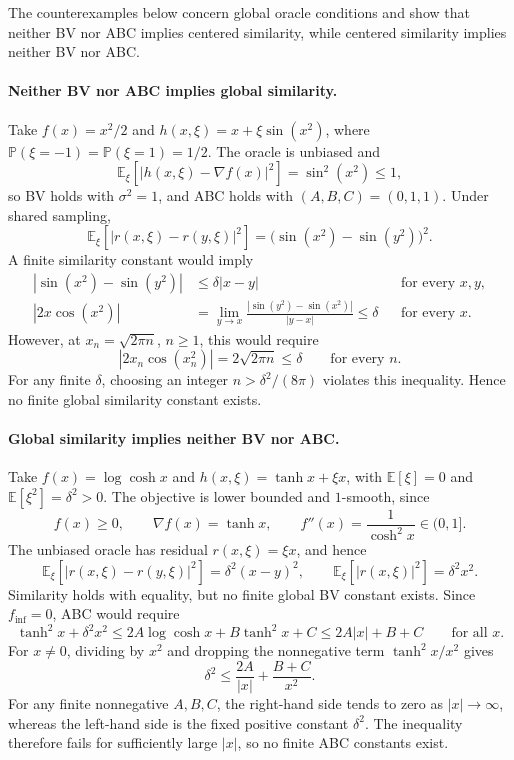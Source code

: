 The counterexamples below concern global oracle conditions
and show that neither BV nor ABC implies centered similarity,
while centered similarity implies neither BV nor ABC.

\paragraph{Neither BV nor ABC implies global similarity.}
Take $f(x)=x^2/2$ and $h(x,\xi)=x+\xi\sin(x^2)$, where
$\mathbb P(\xi=-1)=\mathbb P(\xi=1)=1/2$. The oracle is
unbiased and
\[
\mathbb E_\xi[|h(x,\xi)-\nabla f(x)|^2]
 =\sin^2(x^2)\leq1,
\]
so BV holds with $\sigma^2=1$, and ABC holds with $(A,B,C)=(0,1,1)$.
Under shared sampling,
\[
\mathbb E_\xi[|r(x,\xi)-r(y,\xi)|^2]
 =\bigl(\sin(x^2)-\sin(y^2)\bigr)^2.
\]
A finite similarity constant would imply
\[
\begin{aligned}
|\sin(x^2)-\sin(y^2)|&\leq\delta|x-y|
   &&\text{for every }x,y,\\
|2x\cos(x^2)|
 &=\lim_{y\to x}\frac{|\sin(y^2)-\sin(x^2)|}{|y-x|}
 \leq\delta &&\text{for every }x.
\end{aligned}
\]
However, at $x_n=\sqrt{2\pi n}$, $n\geq1$, this would require
\[
|2x_n\cos(x_n^2)|=2\sqrt{2\pi n}\leq\delta
\qquad\text{for every }n.
\]
For any finite $\delta$, choosing an integer $n>\delta^2/(8\pi)$
violates this inequality. Hence no finite global similarity constant
exists.

\paragraph{Global similarity implies neither BV nor ABC.}
Take $f(x)=\log\cosh x$ and
$h(x,\xi)=\tanh x+\xi x$, with
$\mathbb E[\xi]=0$ and $\mathbb E[\xi^2]=\delta^2>0$.
The objective is lower bounded and $1$-smooth, since
\[
f(x)\geq0,\qquad \nabla f(x)=\tanh x,\qquad
f''(x)=\frac1{\cosh^2x}\in(0,1].
\]
The unbiased oracle has residual $r(x,\xi)=\xi x$, and hence
\[
\mathbb E_\xi[|r(x,\xi)-r(y,\xi)|^2]
 =\delta^2(x-y)^2,
\qquad
\mathbb E_\xi[|r(x,\xi)|^2]=\delta^2x^2.
\]
Similarity holds with equality, but no finite global BV constant
exists. Since $f_{\inf}=0$, ABC would require
\[
\tanh^2x+\delta^2x^2
\leq2A\log\cosh x+B\tanh^2x+C
\leq2A|x|+B+C
\qquad\text{for all }x.
\]
For $x\neq0$, dividing by $x^2$ and dropping the nonnegative term
$\tanh^2x/x^2$ gives
\[
\delta^2\leq\frac{2A}{|x|}+\frac{B+C}{x^2}.
\]
For any finite nonnegative $A,B,C$, the right-hand side tends to zero as
$|x|\to\infty$, whereas the left-hand side is the fixed positive
constant $\delta^2$. The inequality therefore fails for sufficiently
large $|x|$, so no finite ABC constants exist.

